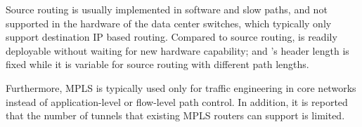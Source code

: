 Source routing is usually implemented in software and slow paths, and not supported in the hardware of the data center switches, which typically only support destination IP based routing. Compared to source routing, \sys is readily deployable without waiting for new hardware capability; and \sys's header length is fixed while it is variable for source routing with different path lengths.


 Furthermore, MPLS is typically used only for traffic engineering in core networks instead of application-level or flow-level path control. In addition, it is reported~\cite{mpls2003,swan} that the number of tunnels that existing MPLS routers can support is limited.




